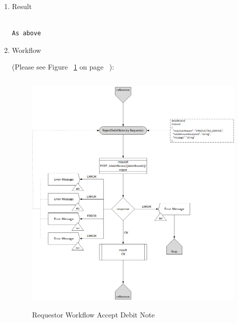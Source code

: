 \begin{enumerate}
\begin{table}[H]
\begin{center}
\begin{tabular}{|c|l|}
\end{tabular}
\end{center}

\end{table}

\item Result

\begin{tcolorbox}[boxrule=0pt, frame empty]
\begin{verbatim}

As above

\end{verbatim}
\end{tcolorbox}


\item Workflow

(Please see Figure ~\ref{fig:RRDN} on page ~\pageref{fig:RRDN}):

\begin{figure}[htbp]
    \centering
    \includegraphics[width=12cm,height=12cm,angle=0]{./diag/Workflow/Payment/RejectDebitNote-R-Workflow.png}
    \caption{Requestor Workflow Accept Debit Note }
	\label{fig:RRDN}
\end{figure}


\end{enumerate}

